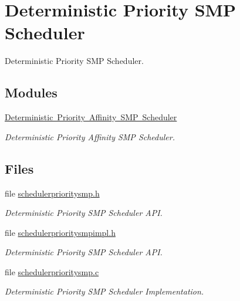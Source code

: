 \hypertarget{group__RTEMSScoreSchedulerPrioritySMP}{}\section{Deterministic Priority S\+MP Scheduler}
\label{group__RTEMSScoreSchedulerPrioritySMP}


Deterministic Priority S\+MP Scheduler.  


\subsection*{Modules}
\begin{DoxyCompactItemize}
\item 
\mbox{\hyperlink{group__RTEMSScoreSchedulerPriorityAffinitySMP}{Deterministic Priority Affinity S\+M\+P Scheduler}}
\begin{DoxyCompactList}\small\item\em Deterministic Priority Affinity S\+MP Scheduler. \end{DoxyCompactList}\end{DoxyCompactItemize}
\subsection*{Files}
\begin{DoxyCompactItemize}
\item 
file \mbox{\hyperlink{schedulerprioritysmp_8h}{schedulerprioritysmp.\+h}}
\begin{DoxyCompactList}\small\item\em Deterministic Priority S\+MP Scheduler A\+PI. \end{DoxyCompactList}\item 
file \mbox{\hyperlink{schedulerprioritysmpimpl_8h}{schedulerprioritysmpimpl.\+h}}
\begin{DoxyCompactList}\small\item\em Deterministic Priority S\+MP Scheduler A\+PI. \end{DoxyCompactList}\item 
file \mbox{\hyperlink{schedulerprioritysmp_8c}{schedulerprioritysmp.\+c}}
\begin{DoxyCompactList}\small\item\em Deterministic Priority S\+MP Scheduler Implementation. \end{DoxyCompactList}\end{DoxyCompactItemize}
